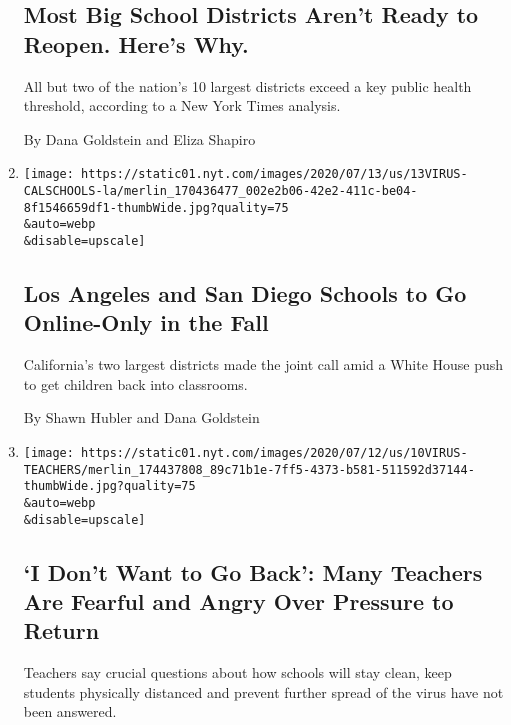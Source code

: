 \begin{enumerate}
{  \subsection{Most Big School Districts Aren't Ready to Reopen. Here's
  Why.}\label{most-big-school-districts-arent-ready-to-reopen-heres-why}}

  All but two of the nation's 10 largest districts exceed a key public
  health threshold, according to a New York Times analysis.

  By Dana Goldstein and Eliza Shapiro
\item
  \href{/2020/07/13/us/lausd-san-diego-school-reopening.html}{}

  \texttt{[image: https://static01.nyt.com/images/2020/07/13/us/13VIRUS-CALSCHOOLS-la/merlin\_170436477\_002e2b06-42e2-411c-be04-8f1546659df1-thumbWide.jpg?quality=75\\\&auto=webp\\\&disable=upscale]}

  \hypertarget{los-angeles-and-san-diego-schools-to-go-online-only-in-the-fall}{%
  \subsection{Los Angeles and San Diego Schools to Go Online-Only in the
  Fall}\label{los-angeles-and-san-diego-schools-to-go-online-only-in-the-fall}}

  California's two largest districts made the joint call amid a White
  House push to get children back into classrooms.

  By Shawn Hubler and Dana Goldstein
\item
  \href{/2020/07/11/us/virus-teachers-classrooms.html}{}

  \texttt{[image: https://static01.nyt.com/images/2020/07/12/us/10VIRUS-TEACHERS/merlin\_174437808\_89c71b1e-7ff5-4373-b581-511592d37144-thumbWide.jpg?quality=75\\\&auto=webp\\\&disable=upscale]}

  \hypertarget{i-dont-want-to-go-back-many-teachers-are-fearful-and-angry-over-pressure-to-return}{%
  \subsection{`I Don't Want to Go Back': Many Teachers Are Fearful and
  Angry Over Pressure to
  Return}\label{i-dont-want-to-go-back-many-teachers-are-fearful-and-angry-over-pressure-to-return}}

  Teachers say crucial questions about how schools will stay clean, keep
  students physically distanced and prevent further spread of the virus
  have not been answered.


\end{enumerate}
